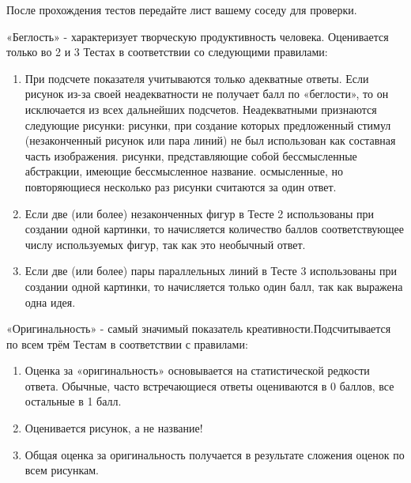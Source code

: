 \begin{landscape}
\begin{multicols}{3}
        После прохождения тестов передайте лист вашему соседу для проверки.
        \newpage
        
    \scriptsize{ «Беглость» - характеризует творческую продуктивность человека. 
    Оценивается только во 2 и 3 Тестах в соответствии со следующими правилами:
\begin{enumerate}[noitemsep,topsep=0pt,parsep=0pt,partopsep=-20pt]
    \item  При подсчете показателя учитываются только адекватные ответы.
    Если рисунок из-за своей неадекватности не получает балл по «беглости», то 
    он исключается из всех дальнейших подсчетов. Неадекватными признаются 
    следующие рисунки:
    рисунки, при создание которых предложенный стимул (незаконченный рисунок 
    или пара линий) не был использован как составная часть изображения.
    рисунки, представляющие собой бессмысленные абстракции, имеющие 
    бессмысленное название.
    осмысленные, но повторяющиеся несколько раз рисунки считаются за один ответ.
    \item   Если две (или более) незаконченных фигур в Тесте 2 использованы 
    при создании одной картинки, то начисляется количество баллов соответствующее 
    числу используемых фигур, так как это необычный ответ.
    \item  Если две (или более) пары параллельных линий в Тесте 3 использованы 
    при создании одной картинки, то начисляется только один балл, так как 
    выражена одна идея.  
\end{enumerate}


«Оригинальность» - самый значимый показатель креативности.Подсчитывается по всем трём Тестам в соответствии с правилами:
\begin{enumerate}[noitemsep,topsep=0pt,parsep=0pt,partopsep=0pt]
    \item  Оценка за «оригинальность» основывается на статистической редкости ответа. Обычные, часто встречающиеся ответы оцениваются в 0 баллов, все остальные в 1 балл.
    \item  Оценивается рисунок, а не название!
    \item  Общая оценка за оригинальность получается в результате сложения оценок по всем рисункам.
\end{enumerate}

}
\end{multicols}
\end{landscape}
